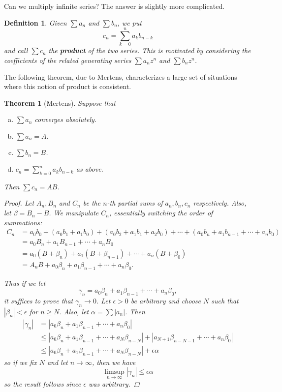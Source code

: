 \documentclass{scrbook}
\renewcommand{\to}{\rightarrow}
\newtheorem{theorem}{Theorem}
\newtheorem{definition}{Definition}
\begin{document}
Can we multiply infinite series? The answer is slightly more complicated.

\begin{definition} %
Given $\sum a_n$ and $\sum b_n$, we put
\[
	c_n = \sum_{k=0}^{n} a_k b_{n-k}
\]
and call $\sum c_n$ the \textbf{product} of the two series. This is motivated by considering the coefficients of the related generating series $\sum a_nz^n$ and $\sum b_nz^n$.
\end{definition}

The following theorem, due to Mertens, characterizes a large set of situations where this notion of product is consistent.

\begin{theorem}[Mertens] %
Suppose that
\begin{enumerate}[(a)]
\item $\sum a_n$ converges absolutely.
\item $\sum a_n = A$.
\item $\sum b_n = B$.
\item $c_n = \sum_{k=0}^{n} a_kb_{n-k}$ as above.
\end{enumerate}
Then $\sum c_n = AB$.

\begin{proof}
Let $A_n, B_n$ and $C_n$ be the $n$-th partial sums of $a_n, b_n, c_n$ respectively. Also, let $\beta = B_n - B$. We manipulate $C_n$, essentially switching the order of summations:
\begin{align*}
C_n &= a_0b_0 + (a_0b_1 + a_1b_0) + (a_0b_2 + a_1b_1 + a_2b_0) + \dotsb + (a_0b_n + a_1b_{n-1} + \dotsb + a_nb_0) \\
	&= a_0B_n + a_1B_{n-1} + \dotsb + a_nB_0 \\
	&= a_0(B + \beta_n) + a_1(B + \beta_{n-1}) + \dotsb + a_n(B + \beta_0) \\
	&= A_nB + a_0\beta_n + a_1\beta_{n-1} + \dotsb + a_n\beta_0.
\end{align*}

Thus if we let 
\[
	\gamma_n = a_0\beta_n + a_1\beta_{n-1} + \dotsb + a_n\beta_0,
\]
it suffices to prove that $\gamma_n \to 0$. Let $\epsilon > 0$ be arbitrary and choose $N$ such that $|\beta_n| < \epsilon$ for $n \ge N$. Also, let $\alpha = \sum |a_n|$. Then
\begin{align*}
|\gamma_n| &= |a_0\beta_n + a_1\beta_{n-1} + \dotsb + a_n\beta_0| \\
	&\le |a_0\beta_n + a_1\beta_{n-1} + \dotsb + a_N\beta_{n-N}| + |a_{N+1}\beta_{n-N-1} + \dotsb + a_n\beta_0| \\
	&\le |a_0\beta_n + a_1\beta_{n-1} + \dotsb + a_N\beta_{n-N}| + \epsilon \alpha
\end{align*}
so if we fix $N$ and let $n \to \infty$, then we have
\[
	\limsup_{n \to \infty} |\gamma_n| \le \epsilon \alpha
\]
so the result follows since $\epsilon$ was arbitrary.
\end{proof}
\end{theorem}
\end{document}
